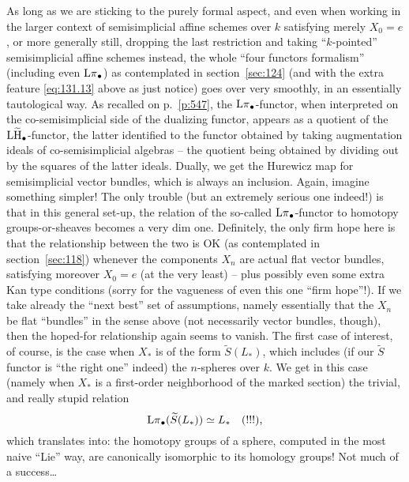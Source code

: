 As long as we are sticking to the purely formal aspect, and even when
working in the larger context of semisimplicial affine schemes over
$k$ satisfying merely $X_0=e$, or more generally still, dropping the
last restriction and taking ``$k$-pointed'' semisimplicial affine
schemes instead, the whole ``four functors formalism'' (including even
$\operatorname{L\pi}_\bullet$) as contemplated in section~\ref{sec:124} (and
with the extra feature \eqref{eq:131.13} above as just
notice) goes over very smoothly, in an essentially tautological
way. As recalled on p.~\ref{p:547}, the $\operatorname{L\pi}_\bullet$-functor, when
interpreted on the co-semisimplicial side of the dualizing functor,
appears as a quotient of the $\operatorname{L\widetilde H}_\bullet$-functor, the latter
identified to the functor obtained by taking augmentation ideals of
co-semisimplicial algebras -- the quotient being obtained by dividing
out by the squares of the latter ideals. Dually, we get the Hurewicz
map for semisimplicial vector bundles, which is always an
inclusion. Again, imagine something simpler! The only trouble (but an
extremely serious one indeed!) is that in this general set-up, the
relation of the so-called $\operatorname{L\pi}_\bullet$-functor to homotopy
groups-or-sheaves becomes a very dim one. Definitely, the only firm
hope here is that the relationship between the two is OK (as
contemplated in section~\ref{sec:118}) whenever the components $X_n$
are actual flat vector bundles, satisfying moreover $X_0=e$ (at the
very least) -- plus possibly even some extra Kan type conditions
(sorry for the vagueness of even this one ``firm hope''!). If we take
already the ``next best'' set of assumptions, namely essentially that
the $X_n$ be flat ``bundles'' in the sense above (not necessarily
vector bundles, though), then the hoped-for relationship again seems
to vanish. The first case of interest, of course, is the case when
$X_*$ is of the form $\widetilde S(L_*)$, which includes (if our
$\widetilde S$ functor is ``the right one'' indeed) the $n$-spheres
over $k$. We get in this case (namely when $X_*$ is a first-order
neighborhood of the marked section) the trivial, and really stupid
relation
\[\operatorname{L\pi}_\bullet(\widetilde S(L_*)) \simeq L_*\quad\text{(!!!),}\]
which translates into: the homotopy groups of a sphere, computed in
the most naive ``Lie'' way, are canonically isomorphic to its homology
groups! Not much of a success\dots

